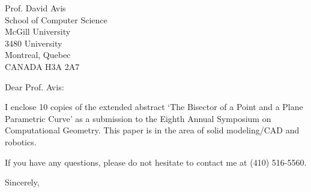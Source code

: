 \signature{John K. Johnstone\\jj@cs.jhu.edu}

\begin{letter}
{Prof. David Avis\\
School of Computer Science\\
McGill University\\
3480 University\\
Montreal, Quebec\\
CANADA  H3A 2A7
}

\opening{Dear Prof. Avis:}

I enclose 10 copies of the extended abstract 
`The Bisector of a Point and a Plane Parametric Curve'
as a submission to the Eighth Annual Symposium on Computational Geometry.
This paper is in the area of solid modeling/CAD and robotics.

If you have any questions, please do not hesitate to contact me at 
(410) 516-5560.

\closing{Sincerely,}
\end{letter}


